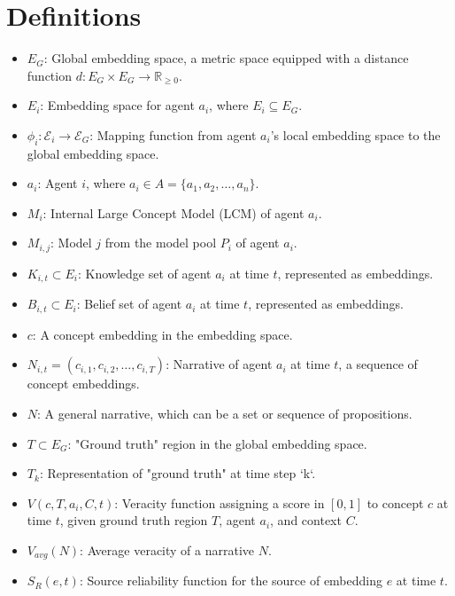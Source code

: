 \documentclass[12pt, a4paper]{article}
\begin{document}
\section{Definitions}

\begin{itemize}
    \item \( E_G \): Global embedding space, a metric space equipped with a distance function \( d: E_G \times E_G \rightarrow \mathbb{R}_{\geq 0} \).
    \item \( E_i \): Embedding space for agent \( a_i \), where \( E_i \subseteq E_G \).
    \item \( \phi_i: \mathcal{E}_i \rightarrow \mathcal{E}_G \): Mapping function from agent \( a_i \)'s local embedding space to the global embedding space.
    \item \( a_i \): Agent \( i \), where \( a_i \in A = \{a_1, a_2, \dots, a_n\} \).
    \item \( M_i \): Internal Large Concept Model (LCM) of agent \( a_i \).
    \item \( M_{i,j} \): Model \(j\) from the model pool \(P_i\) of agent \( a_i \).
    \item \( K_{i,t} \subset E_i \): Knowledge set of agent \( a_i \) at time \( t \), represented as embeddings.
    \item \( B_{i,t} \subset E_i \): Belief set of agent \( a_i \) at time \( t \), represented as embeddings.
    \item \( c \): A concept embedding in the embedding space.
    \item \( N_{i,t} = (c_{i,1}, c_{i,2}, \dots, c_{i,T}) \): Narrative of agent \( a_i \) at time \( t \), a sequence of concept embeddings.
    \item \( N \): A general narrative, which can be a set or sequence of propositions.
    \item \( T \subset E_G \): "Ground truth" region in the global embedding space.
    \item \( T_k \): Representation of "ground truth" at time step `k`.
    \item \( V(c, T, a_i, C, t) \): Veracity function assigning a score in \([0, 1]\) to concept \( c \) at time \(t\), given ground truth region \( T \), agent \( a_i \), and context \( C \).
    \item \( V_{avg}(N) \): Average veracity of a narrative \( N \).
    \item \( S_R(e,t) \): Source reliability function for the source of embedding \(e\) at time \(t\).

\end{itemize}
\end{document}
